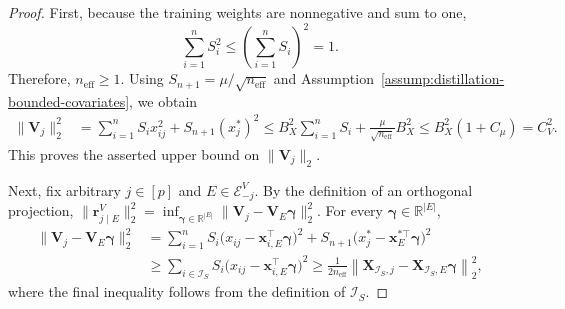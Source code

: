 \documentclass[12pt]{article}
\theoremstyle{definition}
\begin{document}
\begin{proof}
First, because the training weights are nonnegative and sum to one,
\[
    \sum_{i=1}^nS_i^2
    \le
    \left(\sum_{i=1}^nS_i\right)^2
    =
    1.
\]
Therefore, \(n_{\mathrm{eff}}\ge1\). Using
\(S_{n+1}=\mu/\sqrt{n_{\mathrm{eff}}}\) and
Assumption~\ref{assump:distillation-bounded-covariates}, we obtain
\begin{align*}
    \|\boldsymbol V_j\|_2^2
    &=
    \sum_{i=1}^nS_i x_{ij}^2
    +
    S_{n+1}(x_j^*)^2
    \le
    B_X^2\sum_{i=1}^nS_i
    +
    \frac{\mu}{\sqrt{n_{\mathrm{eff}}}}B_X^2
    \le
    B_X^2(1+C_\mu)
    =
    C_V^2.
\end{align*}
This proves the asserted upper bound on \(\|\boldsymbol V_j\|_2\).

Next, fix arbitrary $j\in[p]$ and \(E\in\mathcal E_{-j}^V\). 
By the definition of an orthogonal projection,
$\|\boldsymbol r_{j\mid E}^V\|_2^2
    =
    \inf_{\boldsymbol{\gamma}\in\mathbb R^{|E|}}
    \|\boldsymbol V_j-\boldsymbol V_E\boldsymbol{\gamma}\|_2^2$.
For every \(\boldsymbol{\gamma}\in\mathbb R^{|E|}\),
\begin{align*}
    \|\boldsymbol V_j-\boldsymbol V_E\boldsymbol{\gamma}\|_2^2
    &=
    \sum_{i=1}^n
        S_i\bigl(x_{ij}-\boldsymbol x_{i,E}^{\top}\boldsymbol{\gamma}\bigr)^2
    +
    S_{n+1}
        \bigl(x_j^*-\boldsymbol x_E^{*\top}\boldsymbol{\gamma}\bigr)^2\\
    &\ge
    \sum_{i\in\mathcal I_S}
        S_i\bigl(x_{ij}-\boldsymbol x_{i,E}^{\top}\boldsymbol{\gamma}\bigr)^2\ge
    \frac{1}{2n_{\mathrm{eff}}}
    \left\|
        \boldsymbol X_{\mathcal I_S,j}
        -
        \boldsymbol X_{\mathcal I_S,E}\boldsymbol{\gamma}
    \right\|_2^2,
\end{align*}
where the final inequality follows from the definition of
\(\mathcal I_S\).


\end{proof}
\end{document}
